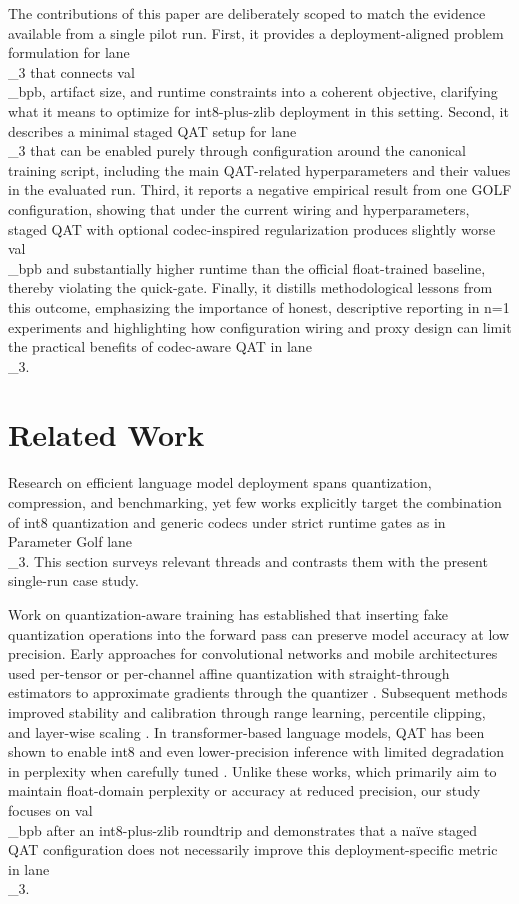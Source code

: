 \documentclass{article}
\begin{document}
The contributions of this paper are deliberately scoped to match the evidence available from a single pilot run. First, it provides a deployment-aligned problem formulation for lane\\_3 that connects val\\_bpb, artifact size, and runtime constraints into a coherent objective, clarifying what it means to optimize for int8-plus-zlib deployment in this setting. Second, it describes a minimal staged QAT setup for lane\\_3 that can be enabled purely through configuration around the canonical training script, including the main QAT-related hyperparameters and their values in the evaluated run. Third, it reports a negative empirical result from one GOLF configuration, showing that under the current wiring and hyperparameters, staged QAT with optional codec-inspired regularization produces slightly worse val\\_bpb and substantially higher runtime than the official float-trained baseline, thereby violating the quick-gate. Finally, it distills methodological lessons from this outcome, emphasizing the importance of honest, descriptive reporting in n=1 experiments and highlighting how configuration wiring and proxy design can limit the practical benefits of codec-aware QAT in lane\\_3.

\section{Related Work}

\label{sec:related_work}

Research on efficient language model deployment spans quantization, compression, and benchmarking, yet few works explicitly target the combination of int8 quantization and generic codecs under strict runtime gates as in Parameter Golf lane\\_3. This section surveys relevant threads and contrasts them with the present single-run case study.

Work on quantization-aware training has established that inserting fake quantization operations into the forward pass can preserve model accuracy at low precision. Early approaches for convolutional networks and mobile architectures used per-tensor or per-channel affine quantization with straight-through estimators to approximate gradients through the quantizer \cite{jacob2018quantization, zhang2018lq}. Subsequent methods improved stability and calibration through range learning, percentile clipping, and layer-wise scaling \cite{nagel2021up, esser2020learned}. In transformer-based language models, QAT has been shown to enable int8 and even lower-precision inference with limited degradation in perplexity when carefully tuned \cite{zafrir2019q8bert, li2023qlinear}. Unlike these works, which primarily aim to maintain float-domain perplexity or accuracy at reduced precision, our study focuses on val\\_bpb after an int8-plus-zlib roundtrip and demonstrates that a naïve staged QAT configuration does not necessarily improve this deployment-specific metric in lane\\_3.
\end{document}
